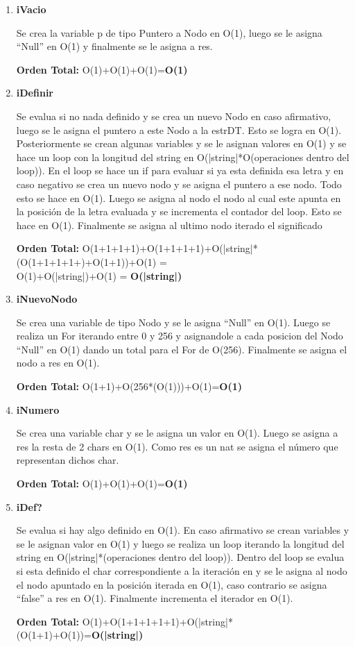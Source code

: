 \vspace*{1em}
\begin{enumerate}

\item\textbf{iVacio}
\par Se crea la variable p de tipo Puntero a Nodo en O(1), luego se le asigna ``Null'' en O(1) y finalmente se le asigna a res. 
\par \textbf{Orden Total:} O(1)+O(1)+O(1)=\textbf{O(1)}

\item\textbf{iDefinir}
\par Se evalua si no nada definido y se crea un nuevo Nodo en caso afirmativo, luego se le asigna el puntero a este Nodo a la estrDT. Esto se logra en O(1).
Posteriormente se crean algunas variables y se le asignan valores en O(1) y se hace un loop con la longitud del string en O(|string|*O(operaciones dentro del loop)). En el loop se hace un if para evaluar si ya esta definida esa letra y en caso negativo se crea un nuevo nodo y se asigna el puntero a ese nodo. Todo esto se hace en O(1). Luego se asigna al nodo el nodo al cual este apunta en la posición de la letra evaluada y se incrementa el contador del loop. Esto se hace en O(1). Finalmente se asigna al ultimo nodo iterado el significado 
\par \textbf{Orden Total:} O(1+1+1+1)+O(1+1+1+1)+O(|string|*(O(1+1+1+1+)+O(1+1))+O(1) =\\
O(1)+O(|string|)+O(1) = \textbf{O(|string|)}

\item\textbf{iNuevoNodo}
\par Se crea una variable de tipo Nodo y se le asigna ``Null'' en O(1). Luego se realiza un For iterando entre 0 y 256 y asignandole a cada posicion del Nodo ``Null'' en O(1) dando un total para el For de O(256). Finalmente se asigna el nodo a res en O(1).
\par \textbf{Orden Total:} O(1+1)+O(256*(O(1)))+O(1)=\textbf{O(1)}

\item\textbf{iNumero}
\par Se crea una variable char y se le asigna un valor en O(1). Luego se asigna a res la resta de 2 chars en O(1). Como res es un nat se asigna el número que representan dichos char.
\par \textbf{Orden Total:} O(1)+O(1)+O(1)=\textbf{O(1)}

\item\textbf{iDef?}
\par Se evalua si hay algo definido en O(1). En caso afirmativo se crean variables y se le asignan valor en O(1) y luego se realiza un loop iterando la longitud del string en O(|string|*(operaciones dentro del loop)). Dentro del loop se evalua si esta definido el char correspondiente a la iteración en y se le asigna al nodo el nodo apuntado en la posición iterada en O(1), caso contrario se asigna ``false'' a res en O(1). Finalmente incrementa el iterador en O(1).
\par \textbf{Orden Total:} O(1)+O(1+1+1+1+1)+O(|string|*(O(1+1)+O(1))=\textbf{O(|string|)}


\end{enumerate}
